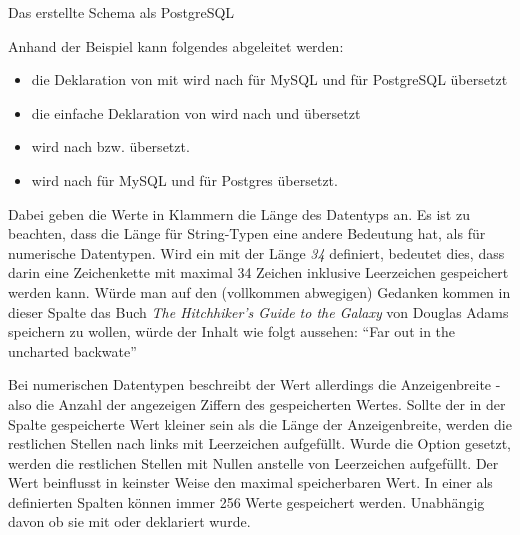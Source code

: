 \begin{listing}[H]
\caption{Das erstellte Schema als PostgreSQL}
\label{lst:pgsqlFromSchema}
\end{listing}

Anhand der Beispiel kann folgendes abgeleitet werden:

\begin{itemize}
	\item die Deklaration von  mit  wird nach  für MySQL und  für PostgreSQL übersetzt
	\item die einfache Deklaration von  wird nach  und  übersetzt
	\item {} wird nach  bzw.  übersetzt.
	\item {} wird nach  für MySQL und  für Postgres übersetzt.
\end{itemize}

Dabei geben die Werte in Klammern die Länge des Datentyps an. Es ist zu beachten, dass die Länge für String-Typen eine andere Bedeutung hat, als für numerische Datentypen. Wird ein  mit der Länge \textit{34} definiert, bedeutet dies, dass darin eine Zeichenkette mit maximal 34 Zeichen inklusive Leerzeichen gespeichert werden kann. Würde man auf den (vollkommen abwegigen) Gedanken kommen in dieser Spalte das Buch \textit{The Hitchhiker's Guide to the Galaxy} von Douglas Adams speichern zu wollen, würde der Inhalt wie folgt aussehen: ``Far out in the uncharted backwate'' \cite[S. 3]{book:adamsHitchhikers1995}

Bei numerischen Datentypen beschreibt der Wert allerdings die Anzeigenbreite - also die Anzahl der angezeigen Ziffern des gespeicherten Wertes. Sollte der in der Spalte gespeicherte Wert kleiner sein als die Länge der Anzeigenbreite, werden die restlichen Stellen nach links mit Leerzeichen aufgefüllt. Wurde die Option  gesetzt, werden die restlichen Stellen mit Nullen anstelle von Leerzeichen aufgefüllt. Der Wert beinflusst in keinster Weise den maximal speicherbaren Wert. In einer als  definierten Spalten können immer 256 Werte gespeichert werden. Unabhängig davon ob sie mit  oder  deklariert wurde.


